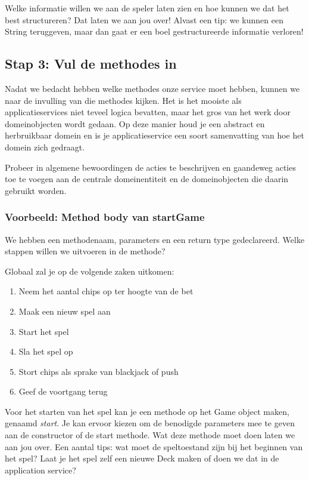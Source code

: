 \documentclass[dutch,a4paper,12pt,doubleside]{book}
\begin{document}
Welke informatie willen we aan de speler laten zien
en hoe kunnen we dat het best structureren? Dat laten we aan jou over!
Alvast een tip: we kunnen een String teruggeven, 
maar dan gaat er een boel gestructureerde informatie verloren!

\subsection{Stap 3: Vul de methodes in}
Nadat we bedacht hebben welke methodes onze service moet hebben, 
kunnen we naar de invulling van die methodes kijken.
Het is het mooiste als applicatieservices niet teveel logica bevatten,
maar het gros van het werk door domeinobjecten wordt gedaan.
Op deze manier houd je een abstract en herbruikbaar domein en is je 
applicatieservice een soort samenvatting van hoe het domein zich gedraagt.

Probeer in algemene bewoordingen de acties te beschrijven 
en gaandeweg acties toe te voegen aan de centrale domeinentiteit
en de domeinobjecten die daarin gebruikt worden.

\subsubsection{Voorbeeld: Method body van startGame}
We hebben een methodenaam, parameters en een return type gedeclareerd.
Welke stappen willen we uitvoeren in de methode? 

Globaal zal je op de volgende zaken uitkomen:

\begin{enumerate}
    \item Neem het aantal chips op ter hoogte van de bet
    \item Maak een nieuw spel aan
    \item Start het spel
    \item Sla het spel op
    \item Stort chips als sprake van blackjack of push
    \item Geef de voortgang terug
\end{enumerate}

Voor het starten van het spel kan je een methode op het Game object maken,
genaamd \textit{start}. Je kan ervoor kiezen om de benodigde parameters mee te geven aan de 
constructor of de start methode. Wat deze methode moet doen laten we aan jou over.
Een aantal tips: wat moet de speltoestand zijn bij het beginnen van het spel?
Laat je het spel zelf een nieuwe Deck maken of doen we dat in de application service?
\end{document}
